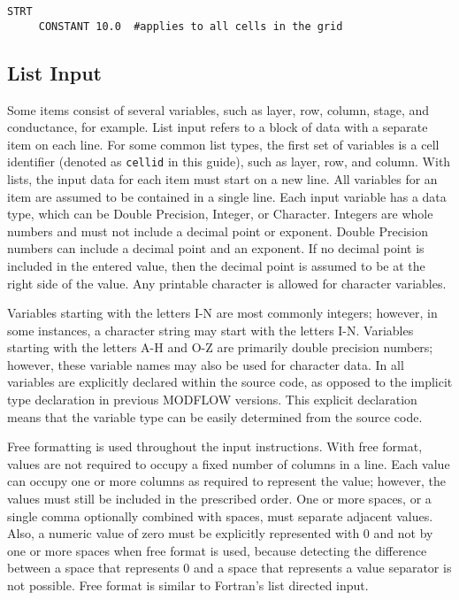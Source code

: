 \begin{lstlisting}[style=inputfile]
  STRT
     CONSTANT 10.0  #applies to all cells in the grid
\end{lstlisting}

\subsection{List Input}
Some items consist of several variables, such as layer, row, column, stage, and conductance, for example.  List input refers to a block of data with a separate item on each line.  For some common list types, the first set of variables is a cell identifier (denoted as \texttt{cellid} in this guide), such as layer, row, and column. With lists, the input data for each item must start on a new line. All variables for an item are assumed to be contained in a single line.  Each input variable has a data type, which can be Double Precision, Integer, or Character. Integers are whole numbers and must not include a decimal point or exponent. Double Precision numbers can include a decimal point and an exponent. If no decimal point is included in the entered value, then the decimal point is assumed to be at the right side of the value. Any printable character is allowed for character variables. 

Variables starting with the letters I-N are most commonly integers; however, in some instances, a character string may start with the letters I-N. Variables starting with the letters A-H and O-Z are primarily double precision numbers; however, these variable names may also be used for character data.  In \mf all variables are explicitly declared within the source code, as opposed to the implicit type declaration in previous MODFLOW versions.  This explicit declaration means that the variable type can be easily determined from the source code.

Free formatting is used throughout the input instructions.  With free format, values are not required to occupy a fixed number of columns in a line. Each value can occupy one or more columns as required to represent the value; however, the values must still be included in the prescribed order. One or more spaces, or a single comma optionally combined with spaces, must separate adjacent values. Also, a numeric value of zero must be explicitly represented with 0 and not by one or more spaces when free format is used, because detecting the difference between a space that represents 0 and a space that represents a value separator is not possible. Free format is similar to Fortran's list directed input.

